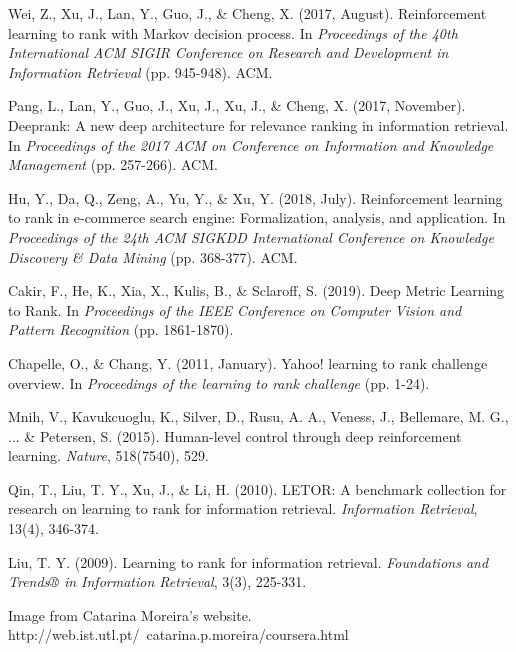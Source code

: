 \documentclass{article}
\begin{document}
\begin{thebibliography}{1}

Wei, Z., Xu, J., Lan, Y., Guo, J., \& Cheng, X. (2017, August). Reinforcement learning to
rank with Markov decision process. In \textit{Proceedings of the 40th International ACM SIGIR
Conference on Research and Development in Information Retrieval} (pp. 945-948). ACM.

Pang, L., Lan, Y., Guo, J., Xu, J., Xu, J., \& Cheng, X. (2017, November). Deeprank: A
new deep architecture for relevance ranking in information retrieval. In \textit{Proceedings of
the 2017 ACM on Conference on Information and Knowledge Management} (pp.
257-266). ACM.

Hu, Y., Da, Q., Zeng, A., Yu, Y., \& Xu, Y. (2018, July). Reinforcement learning to rank
in e-commerce search engine: Formalization, analysis, and application. In \textit{Proceedings of
the 24th ACM SIGKDD International Conference on Knowledge Discovery \& Data Mining} (pp. 368-377). ACM.

Cakir, F., He, K., Xia, X., Kulis, B., \& Sclaroff, S. (2019). Deep Metric Learning to
Rank. In \textit{Proceedings of the IEEE Conference on Computer Vision and Pattern
Recognition} (pp. 1861-1870).

Chapelle, O., \& Chang, Y. (2011, January). Yahoo! learning to rank challenge overview. In \textit{Proceedings of the learning to rank challenge} (pp. 1-24).

Mnih, V., Kavukcuoglu, K., Silver, D., Rusu, A. A., Veness, J., Bellemare, M. G., ... \& Petersen, S. (2015). Human-level control through deep reinforcement learning. \textit{Nature}, 518(7540), 529.

Qin, T., Liu, T. Y., Xu, J., \& Li, H. (2010). LETOR: A benchmark collection for research on learning to rank for information retrieval. \textit{Information Retrieval}, 13(4), 346-374.

Liu, T. Y. (2009). Learning to rank for information retrieval. \textit{Foundations and Trends® in Information Retrieval}, 3(3), 225-331.

Image from Catarina Moreira's website. http://web.ist.utl.pt/~catarina.p.moreira/coursera.html

\end{thebibliography}
\end{document}
